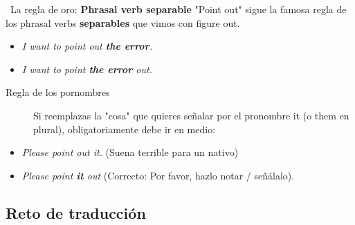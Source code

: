 \documentclass[
10pt, %
a4paper, %
oneside, %
headinclude,footinclude, %
BCOR5mm, %
]{scrartcl}
\begin{document}
\begin{InfoBox}{\textcolor{Goldenrod}{} \, La regla de oro: \textbf{Phrasal verb separable}} 
	"Point out" sigue la famosa regla de los phrasal verbs \textbf{separables} que vimos con figure out.
	
	\begin{itemize}
		\item \textcolor{green}{} \textit{I want to point out \textbf{the error}.}
		\item \textcolor{green}{} \textit{I want to point \textbf{the error} out.} 
	\end{itemize}
	
	\begin{description}
		\item[Regla de los pornombres] Si reemplazas la "cosa" que quieres señalar por el pronombre it (o them en plural), obligatoriamente debe ir en medio:
	\end{description}
	
	\begin{itemize}
		\item \textcolor{red}{} \textit{Please point out it.} (Suena terrible para un nativo)
		\item \textcolor{green}{} \textit{Please point \textbf{it} out} (Correcto: Por favor, hazlo notar / señálalo).
	\end{itemize}
\end{InfoBox}


\subsection{Reto de traducción}
\end{document}
